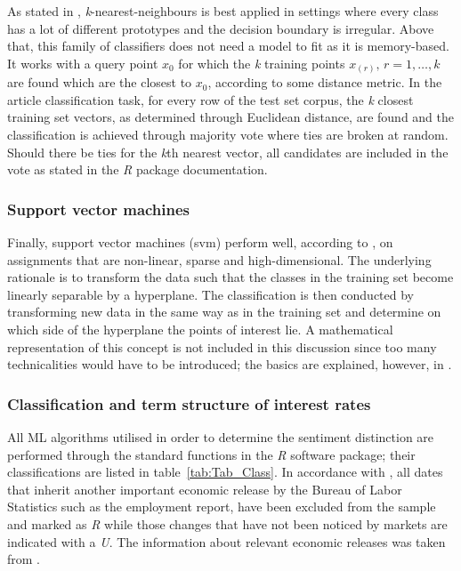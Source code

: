 As stated in \textcite[p.~465]{Friedman.2001}, \textit{k}-nearest-neighbours is best applied in settings where every class has a lot of different prototypes and the decision boundary is irregular. Above that, this family of classifiers does not need a model to fit as it is memory-based. It works with a query point $x_0$ for which the \textit{k} training points $x_{(r)},\, r=1,\dots,k$ are found which are the closest to $x_0$, according to some distance metric. In the article classification task, for every row of the test set corpus, the \textit{k} closest training set vectors, as determined through Euclidean distance, are found and the classification is achieved through majority vote where ties are broken at random. Should there be ties for the \textit{k}th nearest vector, all candidates are included in the vote as stated in the \textit{R} package documentation. 


\subsubsection{Support vector machines} %

Finally, support vector machines (svm) perform well, according to \textcite[p.~293]{Williams.2011}, on assignments that are non-linear, sparse and high-dimensional. The underlying rationale is to transform the data such that the classes in the training set become linearly separable by a hyperplane. The classification is then conducted by transforming new data in the same way as in the training set and determine on which side of the hyperplane the points of interest lie. A mathematical representation of this concept is not included in this discussion since too many technicalities would have to be introduced; the basics are explained, however, in \textcite[p.~417]{Friedman.2001}. 

%
\subsubsection{Classification and term structure of interest rates}

All ML algorithms utilised in order to determine the sentiment distinction are performed through the standard functions in the \textit{R} software package; their classifications are listed in table~\vref{tab:Tab_Class}. 
In accordance with \textcite{Ellingsen.2003}, all dates that inherit another important economic release by the Bureau of Labor Statistics such as the employment report, have been excluded from the sample and marked as \textit{R} while those changes that have not been noticed by markets are indicated with a \textit{U}. The information about relevant economic releases was taken from \textcite{BoLS.2017}.
%

%

